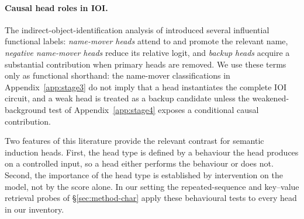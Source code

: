 \paragraph{Causal head roles in IOI.}
The indirect-object-identification analysis of \citet{wang2023ioi} introduced
several influential functional labels: \emph{name-mover heads} attend to and
promote the relevant name, \emph{negative name-mover heads} reduce its relative
logit, and \emph{backup heads} acquire a substantial contribution when primary
heads are removed. We use these terms only as functional shorthand: the
name-mover classifications in Appendix~\ref{app:stage3} do not imply that a
head instantiates the complete IOI circuit, and a weak head is treated as a
backup candidate unless the weakened-background test of
Appendix~\ref{app:stage4} exposes a conditional causal contribution.

Two features of this literature provide the relevant contrast for semantic
induction heads. First,
the head type is defined by a behaviour the head produces on a controlled input, so a
head either performs the behaviour or does not. Second, the importance of the head
type is established by intervention on the model, not by the score alone. In our
setting the repeated-sequence and key--value retrieval probes of
\S\ref{sec:method-char} apply these behavioural tests to every head in our inventory.
